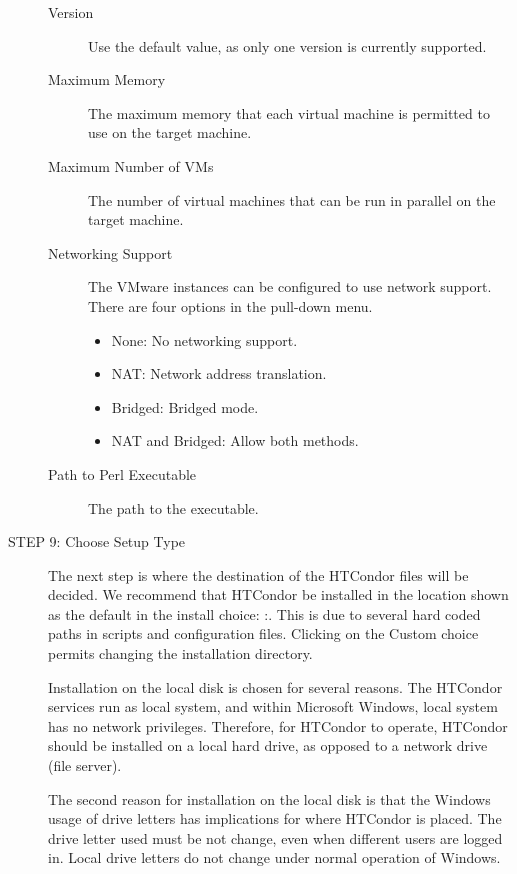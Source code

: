 \begin{description}
     \begin{description}
     \item[Version]
     Use the default value, as only one version is currently supported.
     \item[Maximum Memory]
     The maximum memory that each virtual machine is permitted to use 
     on the target machine.
     \item[Maximum Number of VMs]
     The number of virtual machines that can be run in parallel 
     on the target machine.
     \item[Networking Support]
     The VMware instances can be configured to use network support.
     There are four options in the pull-down menu.
          \begin{itemize}
          \item None: No networking support.
          \item NAT: Network address translation.
          \item Bridged: Bridged mode.
          \item NAT and Bridged: Allow both methods.
          \end{itemize}
     \item[Path to Perl Executable]
     The path to the  executable.
     \end{description}

\item[STEP 9: Choose Setup Type]

The next step is where the destination of the HTCondor files will be
decided.
We recommend that HTCondor be installed in the location shown as the default 
in the install choice:
\verb@C:\Condor@. This is due to several hard coded
paths in scripts and configuration files.
Clicking on the Custom choice permits changing the installation directory.

Installation on the local disk is chosen for several reasons.
The HTCondor services run as local system, and within Microsoft Windows, 
local system has no network privileges.
Therefore, for HTCondor to operate, 
HTCondor should be installed on a local hard drive,
as opposed to a network drive (file server).

The second reason for installation on the local disk is that
the Windows usage of drive letters has implications for where
HTCondor is placed.
The drive letter used must be not change, even when different users are
logged in.
Local drive letters do not change under normal operation of Windows.


\end{description}
